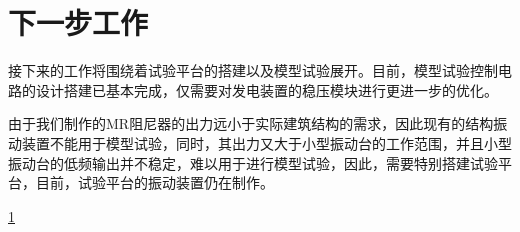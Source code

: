 \section{下一步工作}

接下来的工作将围绕着试验平台的搭建以及模型试验展开。目前，模型试验控制电路的设计搭建已基本完成，仅需要对发电装置的稳压模块进行更进一步的优化。

由于我们制作的MR阻尼器的出力远小于实际建筑结构的需求，因此现有的结构振动装置不能用于模型试验，同时，其出力又大于小型振动台的工作范围，并且小型振动台的低频输出并不稳定，难以用于进行模型试验，因此，需要特别搭建试验平台，目前，试验平台的振动装置仍在制作。

\ref{}